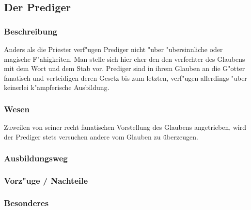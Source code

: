 \subsection{Der Prediger}
\subsubsection{Beschreibung}
\par Anders als die Priester verf"ugen Prediger nicht "uber "ubersinnliche
oder magische F"ahigkeiten. Man stelle sich hier eher den den
verfechter des Glaubens mit dem Wort und dem Stab vor. Prediger sind
in ihrem Glauben an die G"otter fanatisch und verteidigen deren
Gesetz bis zum letzten, verf"ugen allerdings "uber keinerlei
k"ampferische Ausbildung.
\subsubsection{Wesen}
\par Zuweilen von seiner recht fanatischen Vorstellung des Glaubens
angetrieben, wird der Prediger stets versuchen andere vom Glauben zu
überzeugen.
\subsubsection{Ausbildungsweg}
\subsubsection{Vorz"uge / Nachteile}
\subsubsection{Besonderes}
